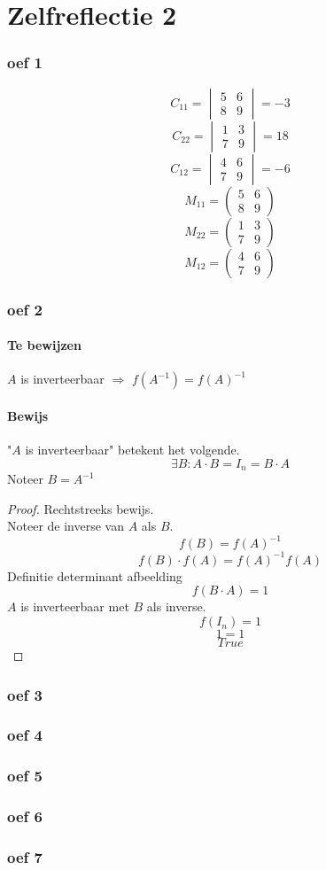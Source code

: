 \documentclass[lineaire_algebra_oplossingen.tex]{subfiles}
\begin{document}
\part{Zelfreflectie 2}
\section{oef 1}
\[
C_{11} = 
\begin{vmatrix}
5 & 6 \\
8 & 9
\end{vmatrix}
=-3
\]
\[
C_{22}= 
\begin{vmatrix}
1 & 3 \\
7 & 9
\end{vmatrix}
=
18
\]
\[
C_{12} =
\begin{vmatrix}
4 & 6 \\
7 & 9
\end{vmatrix}
=-6
\]
\[
M_{11} = 
\begin{pmatrix}
5 & 6 \\
8 & 9
\end{pmatrix}
\]
\[
M_{22}= 
\begin{pmatrix}
1 & 3 \\
7 & 9
\end{pmatrix}
\]
\[
M_{12} =
\begin{pmatrix}
4 & 6 \\
7 & 9
\end{pmatrix}
\]
\section{oef 2}
\subsection*{Te bewijzen}
$A$ is inverteerbaar $\Rightarrow$ $f(A^{-1}) = f(A)^{-1}$
\subsection*{Bewijs}
"$A$ is inverteerbaar" betekent het volgende.
\[
\exists B: A\cdot B = I_n = B\cdot A
\]
Noteer $B = A^{-1}$ 
\begin{proof}
Rechtstreeks bewijs.\\
Noteer de inverse van $A$ als $B$.
\[
f(B) = f(A)^{-1}
\]
\[
f(B)\cdot f(A) = f(A)^{-1}f(A)
\]
Definitie determinant afbeelding
\[
f(B\cdot A) = 1
\]
$A$ is inverteerbaar met $B$ als inverse.
\[
f(I_n) = 1
\]
\[
1 = 1
\]
\[
True
\]


\end{proof}
\section{oef 3}
\section{oef 4}
\section{oef 5}
\section{oef 6}
\section{oef 7}
\end{document}
